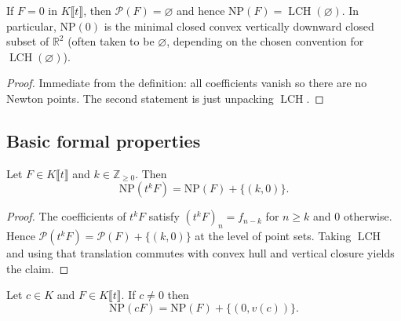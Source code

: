 \begin{lemma}
  \label{lem:newton_polygon_zero}
  \leanok
  If $F=0$ in $K\llbracket t\rrbracket$, then $\mathcal{P}(F)=\varnothing$ and hence $\mathrm{NP}(F)=\operatorname{LCH}(\varnothing)$.
  In particular, $\mathrm{NP}(0)$ is the minimal closed convex vertically downward closed subset of $\mathbb{R}^2$
  (often taken to be $\varnothing$, depending on the chosen convention for $\operatorname{LCH}(\varnothing)$).
\end{lemma}

\begin{proof}
  \leanok
  Immediate from the definition: all coefficients vanish so there are no Newton points.
  The second statement is just unpacking $\operatorname{LCH}$.
\end{proof}

\subsection{Basic formal properties}

\begin{lemma}
  \label{lem:newton_polygon_tpow}
  \leanok
  Let $F\in K\llbracket t\rrbracket$ and $k\in\mathbb{Z}_{\ge 0}$.
  Then
  \[
    \mathrm{NP}(t^k F)=\mathrm{NP}(F) + \{(k,0)\}.
  \]
\end{lemma}

\begin{proof}
  \leanok
  The coefficients of $t^kF$ satisfy $(t^kF)_n=f_{n-k}$ for $n\ge k$ and $0$ otherwise.
  Hence $\mathcal{P}(t^kF)=\mathcal{P}(F)+\{(k,0)\}$ at the level of point sets.
  Taking $\operatorname{LCH}$ and using that translation commutes with convex hull and vertical closure yields the claim.
\end{proof}

\begin{lemma}
  \label{lem:newton_polygon_smul}
  \leanok
  Let $c\in K$ and $F\in K\llbracket t\rrbracket$.
  If $c\neq 0$ then
  \[
    \mathrm{NP}(cF)=\mathrm{NP}(F)+\{(0,v(c))\}.
  \]
\end{lemma}

